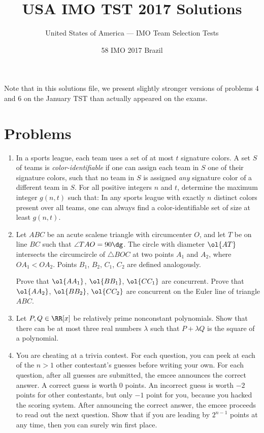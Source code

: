 \documentclass[11pt]{scrartcl}
\begin{document}
\title{USA IMO TST 2017 Solutions}
\subtitle{United States of America --- IMO Team Selection Tests}
\date{58 IMO 2017 Brazil}

Note that in this solutions file,
we present slightly stronger versions of
problems 4 and 6 on the January TST
than actually appeared on the exams.

\maketitle

\tableofcontents
\newpage

\addtocounter{section}{-1}
\section{Problems}
\begin{enumerate}[\bfseries 1.]
\item %
In a sports league, each team uses a set of at most $t$ signature colors.
A set $S$ of teams is \emph{color-identifiable} if one can assign
each team in $S$ one of their signature colors,
such that no team in $S$ is assigned
\emph{any} signature color of a different team in $S$.
For all positive integers $n$ and $t$,
determine the maximum integer $g(n,t)$ such that:
In any sports league with exactly $n$ distinct colors
present over all teams, one can always
find a color-identifiable set of size at least $g(n,t)$.

\item %
Let $ABC$ be an acute scalene triangle with circumcenter $O$,
and let $T$ be on line $BC$ such that $\angle TAO = 90\dg$.
The circle with diameter $\ol{AT}$
intersects the circumcircle of $\triangle BOC$ at two points
$A_1$ and $A_2$, where $OA_1 < OA_2$.
Points $B_1$, $B_2$, $C_1$, $C_2$ are defined analogously.
\begin{enumerate}
  \ii[(a)]
  Prove that $\ol{AA_1}$, $\ol{BB_1}$, $\ol{CC_1}$ are concurrent.
  \ii[(b)]
  Prove that $\ol{AA_2}$, $\ol{BB_2}$, $\ol{CC_2}$ are concurrent
  on the Euler line of triangle $ABC$.
\end{enumerate}

\item %
Let $P, Q \in \RR[x]$ be relatively prime nonconstant polynomials.
Show that there can be at most three real numbers $\lambda$
such that $P + \lambda Q$ is the square of a polynomial.

\item %
You are cheating at a trivia contest.
For each question, you can peek at each of the
$n > 1$ other contestant's guesses before writing your own.
For each question, after all guesses are submitted, the emcee announces the correct answer.
A correct guess is worth $0$ points.
An incorrect guess is worth $-2$ points for other contestants,
but only $-1$ point for you, because you hacked the scoring system.
After announcing the correct answer, the emcee proceeds to read out the next question.
Show that if you are leading by $2^{n-1}$ points at any time,
then you can surely win first place.


\end{enumerate}
\end{document}
